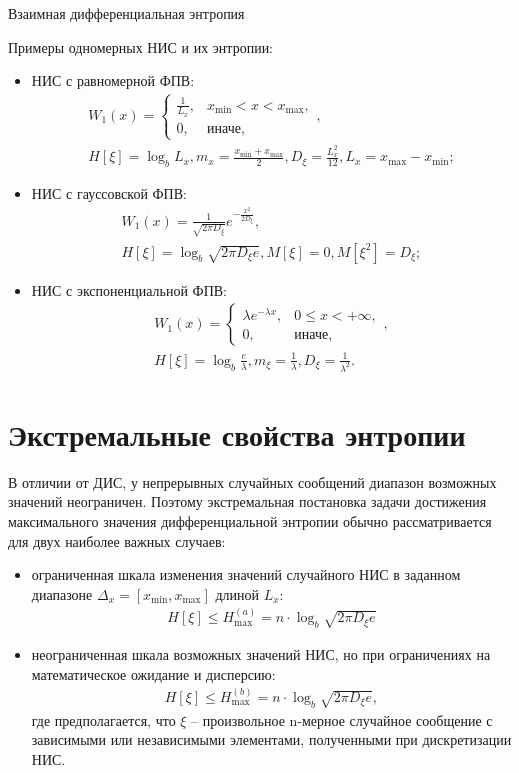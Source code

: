 Взаимная дифференциальная энтропия

Примеры одномерных НИС и их энтропии:
\begin{itemize}
	\item НИС с равномерной ФПВ:
\begin{gather}
	W_1(x) = 
	\begin{cases}
		\frac{1}{L_x}, & x_{\min} < x < x_{\max},\\
		0, & \text{иначе},
	\end{cases}, \\
	H[\xi] = \log_b{L_x}, m_x = \frac{x_{\min} + x_{\max}}{2}, D_\xi = \frac{L_x^2}{12}, L_x = x_{\max} - x_{\min}; \nonumber
\end{gather}
	\item НИС с гауссовской ФПВ:
\begin{gather}
	W_1(x) = \frac{1}{\sqrt{2\pi D_\xi}}e^{-\frac{x^2}{2D_\xi}}, \\
	H[\xi] = \log_b{\sqrt{2\pi D_\xi e}}, M[\xi] = 0, M[\xi^2] = D_\xi; \nonumber
\end{gather}
	\item НИС с экспоненциальной ФПВ:
\begin{gather}
	W_1(x) = 
	\begin{cases}
		\lambda e^{-\lambda x}, & 0 \leq x < +\infty,\\
		0, & \text{иначе},
	\end{cases}, \\
	H[\xi] = \log_b{\frac{e}{\lambda}}, m_\xi = \frac{1}{\lambda}, D_\xi = \frac{1}{\lambda^2}.\nonumber
\end{gather}
\end{itemize}

\section{Экстремальные свойства энтропии}

В отличии от ДИС, у непрерывных случайных сообщений диапазон возможных значений неограничен. Поэтому экстремальная постановка задачи достижения максимального значения дифференциальной энтропии обычно рассматривается для двух наиболее важных случаев:
\begin{itemize}
	\item ограниченная шкала изменения значений случайного НИС в заданном 
	диапазоне $\Delta_x = [x_{\min}, x_{\max}]$ длиной $L_x$:
	\begin{align}
		H[\xi] \leq H^{(a)}_{\max} = n \cdot \log_b{\sqrt{2\pi D_\xi e}}
	\end{align}
	\item неограниченная шкала возможных значений НИС, но при ограничениях на 
	математическое ожидание и дисперсию:
	\begin{align}
		H[\xi] \leq H^{(b)}_{\max} = n \cdot \log_b{\sqrt{2\pi D_\xi e}},
	\end{align}
	где предполагается, что $\xi$ -- произвольное n-мерное случайное сообщение с зависимыми или независимыми элементами, полученными при дискретизации НИС.
\end{itemize}

